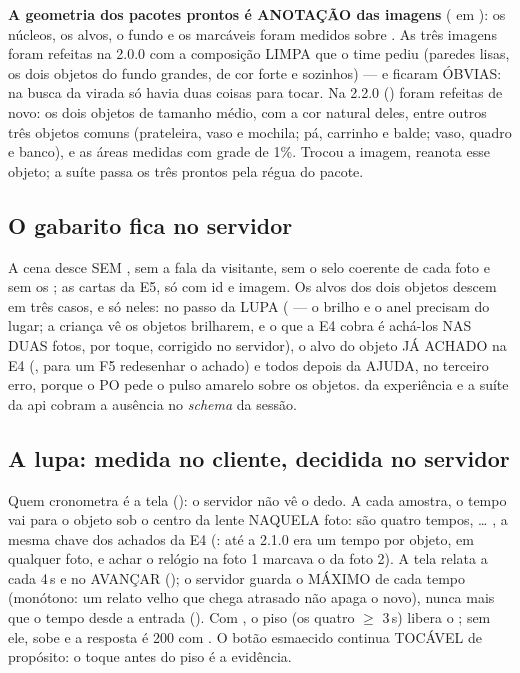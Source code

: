 \begin{atencao}
\textbf{A geometria dos pacotes prontos é ANOTAÇÃO das imagens}
( em ): os núcleos, os alvos, o fundo e
os marcáveis foram medidos sobre .
As três imagens foram refeitas na 2.0.0 com a composição LIMPA que o time
pediu (paredes lisas, os dois objetos do fundo grandes, de cor forte e
sozinhos) --- e ficaram ÓBVIAS: na busca da virada só havia duas coisas para
tocar. Na 2.2.0 () foram refeitas de novo: os dois objetos de
tamanho médio, com a cor natural deles, entre outros três objetos comuns
(prateleira, vaso e mochila; pá, carrinho e balde; vaso, quadro e banco), e as
áreas medidas com grade de 1\%. Trocou a imagem, reanota esse objeto; a suíte
passa os três prontos pela régua do pacote.
\end{atencao}

\subsection{O gabarito fica no servidor}

A cena desce SEM , sem a fala da visitante, sem o selo coerente de
cada foto e sem os ; as cartas da E5, só com id e imagem. Os
alvos dos dois objetos descem em três casos, e só neles: no passo da LUPA
( --- o brilho e o anel precisam do lugar; a criança vê os
objetos brilharem, e o que a E4 cobra é achá-los NAS DUAS fotos, por toque,
corrigido no servidor), o alvo do objeto JÁ ACHADO na E4
(, para um F5 redesenhar o achado) e todos
depois da AJUDA, no terceiro erro, porque o PO pede o pulso amarelo sobre os
objetos.  da experiência e a suíte da api cobram a
ausência no \emph{schema} da sessão.

\subsection{A lupa: medida no cliente, decidida no servidor}

Quem cronometra é a tela (): o servidor não vê o dedo. A
cada amostra, o tempo vai para o objeto sob o centro da lente NAQUELA foto:
são quatro tempos,  \ldots{}
, a mesma chave dos achados da E4
(: até a 2.1.0 era um tempo por objeto, em qualquer foto, e
achar o relógio na foto 1 marcava o da foto 2). A tela relata a cada 4\,s e
no AVANÇAR (); o servidor guarda o MÁXIMO de
cada tempo (monótono: um relato velho que chega atrasado não apaga o novo),
nunca mais que o tempo desde a entrada (). Com
, o piso (os quatro $\geq$ 3\,s) libera o ; sem ele,  sobe
e a resposta é 200 com . O botão esmaecido continua TOCÁVEL
de propósito: o toque antes do piso é a evidência.

